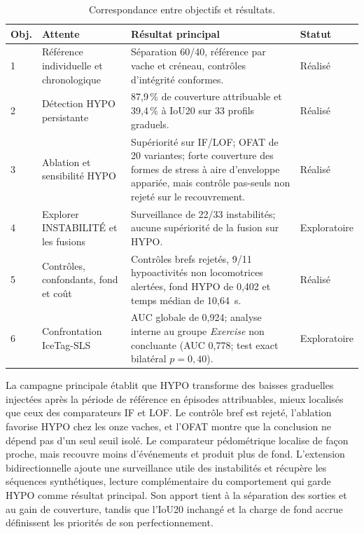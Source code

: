 \begin{table}[H]
  \centering
  \caption{Correspondance entre objectifs et résultats.}
  \label{tab:objectifs_resultats}
  \small
  \begin{tabular}{p{}p{}p{}p{}}
    \toprule
    Obj. & Attente & Résultat principal & Statut \\
    \midrule
    1 & Référence individuelle et chronologique
      & Séparation 60/40, référence par vache et créneau, contrôles d'intégrité conformes.
      & Réalisé \\
    2 & Détection HYPO persistante
      & 87,9\,\% de couverture attribuable et 39,4\,\% à IoU20 sur 33 profils graduels.
      & Réalisé \\
    3 & Ablation et sensibilité HYPO
      & Supériorité sur IF/LOF; OFAT de 20 variantes; forte couverture des formes de stress
        à aire d'enveloppe appariée, mais contrôle pas-seuls non rejeté sur le recouvrement.
      & Réalisé \\
    4 & Explorer INSTABILITÉ et les fusions
      & Surveillance de 22/33 instabilités; aucune supériorité de la fusion sur HYPO.
      & Exploratoire \\
    5 & Contrôles, confondants, fond et coût
      & Contrôles brefs rejetés, 9/11 hypoactivités non locomotrices alertées,
        fond HYPO de 0,402 et temps médian de 10,64~s.
      & Réalisé \\
    6 & Confrontation IceTag-SLS
      & AUC globale de 0,924; analyse interne au groupe \textit{Exercise} non concluante
        (AUC 0,778; test exact bilatéral $p=0{,}40$).
      & Exploratoire \\
    \bottomrule
  \end{tabular}
\end{table}

La campagne principale établit que HYPO transforme des baisses graduelles injectées après
la période de référence en épisodes attribuables, mieux localisés que ceux des comparateurs IF
et LOF. Le contrôle bref est rejeté, l'ablation favorise HYPO chez les onze vaches, et l'OFAT
montre que la conclusion ne dépend pas d'un seul seuil isolé. Le comparateur pédométrique
localise de façon proche, mais recouvre moins d'événements et produit plus de fond.
L'extension bidirectionnelle ajoute une surveillance utile des instabilités et récupère les
séquences synthétiques, lecture complémentaire du comportement qui garde HYPO comme résultat
principal. Son apport tient à la séparation des sorties et au gain de couverture, tandis que
l'IoU20 inchangé et la charge de fond accrue définissent les priorités de son
perfectionnement.
